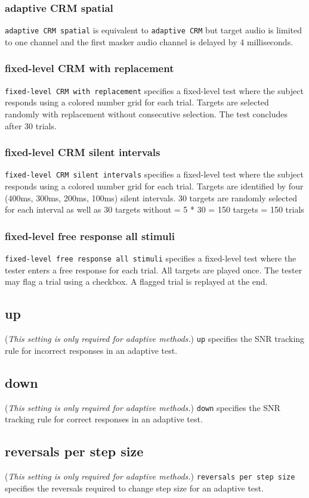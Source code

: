 \documentclass[11pt,pdftex,letterpaper]{article}
\begin{document}
\subsubsection{adaptive CRM spatial}
\texttt{adaptive CRM spatial} is equivalent to \texttt{adaptive CRM} but target audio is limited to one channel and the first masker audio channel is delayed by 4 milliseconds.
\subsubsection{fixed-level CRM with replacement}
\texttt{fixed-level CRM with replacement} specifies a fixed-level test where the subject responds using a colored number grid for each trial. Targets are selected randomly with replacement without consecutive selection. The test concludes after 30 trials.
\subsubsection{fixed-level CRM silent intervals}
\texttt{fixed-level CRM silent intervals} specifies a fixed-level test where the subject responds using a colored number grid for each trial. Targets are identified by four (400ms, 300ms, 200ms, 100ms) silent intervals. 30 targets are randomly selected for each interval as well as 30 targets without = 5 * 30 = 150 targets = 150 trials
\subsubsection{fixed-level free response all stimuli}
\texttt{fixed-level free response all stimuli} specifies a fixed-level test where the tester enters a free response for each trial. All targets are played once. The tester may flag a trial using a checkbox. A flagged trial is replayed at the end.
\subsection{up}
(\textit{This setting is only required for adaptive methods.}) \texttt{up} specifies the SNR tracking rule for incorrect responses in an adaptive test.
\subsection{down}
(\textit{This setting is only required for adaptive methods.}) \texttt{down} specifies the SNR tracking rule for correct responses in an adaptive test.
\subsection{reversals per step size}
(\textit{This setting is only required for adaptive methods.}) \texttt{reversals per step size} specifies the reversals required to change step size for an adaptive test.
\end{document}
